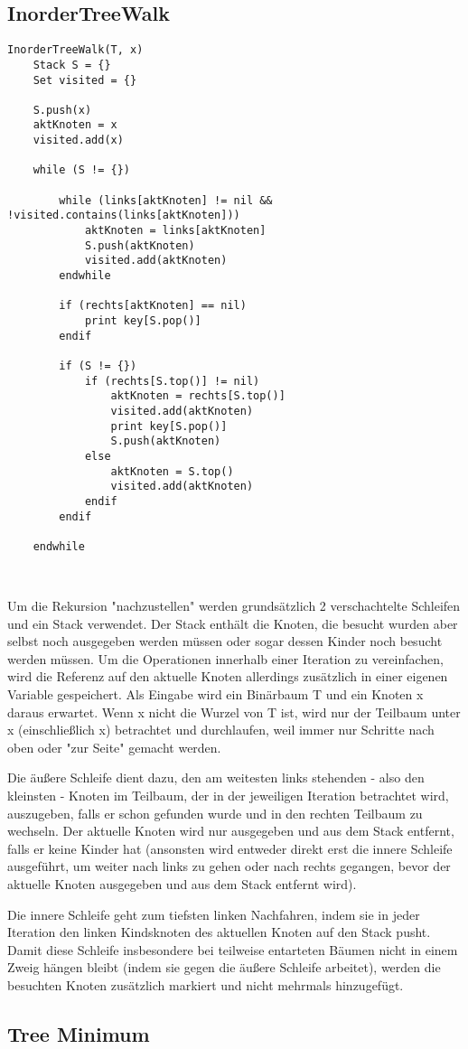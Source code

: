 \subsection*{InorderTreeWalk}

\begin{lstlisting}
InorderTreeWalk(T, x)
	Stack S = {}
	Set visited = {}
	
	S.push(x)
	aktKnoten = x
	visited.add(x)
	
	while (S != {})
	
		while (links[aktKnoten] != nil && !visited.contains(links[aktKnoten]))
			aktKnoten = links[aktKnoten]
			S.push(aktKnoten)
			visited.add(aktKnoten)
		endwhile

		if (rechts[aktKnoten] == nil)
			print key[S.pop()]
		endif
			
		if (S != {})
			if (rechts[S.top()] != nil)
				aktKnoten = rechts[S.top()]
				visited.add(aktKnoten)
				print key[S.pop()]
				S.push(aktKnoten)
			else
				aktKnoten = S.top()
				visited.add(aktKnoten)
			endif
		endif
		
	endwhile
\end{lstlisting}

\begin{tabbing}
\\
\end{tabbing}

Um die Rekursion "nachzustellen" werden grundsätzlich 2 verschachtelte Schleifen und ein Stack verwendet. Der Stack enthält die Knoten, die besucht wurden aber selbst noch ausgegeben werden müssen oder sogar dessen Kinder noch besucht werden müssen. Um die Operationen innerhalb einer Iteration zu vereinfachen, wird die Referenz auf den aktuelle Knoten allerdings zusätzlich in einer eigenen Variable gespeichert. Als Eingabe wird ein Binärbaum T und ein Knoten x daraus erwartet. Wenn x nicht die Wurzel von T ist, wird nur der Teilbaum unter x (einschließlich x) betrachtet und durchlaufen, weil immer nur Schritte nach oben oder "zur Seite" gemacht werden.

Die äußere Schleife dient dazu, den am weitesten links stehenden - also den kleinsten - Knoten im Teilbaum, der in der jeweiligen Iteration betrachtet wird, auszugeben, falls er schon gefunden wurde und in den rechten Teilbaum zu wechseln. 
Der aktuelle Knoten wird nur ausgegeben und aus dem Stack entfernt, falls er keine Kinder hat (ansonsten wird entweder direkt erst die innere Schleife ausgeführt, um weiter nach links zu gehen oder nach rechts gegangen, bevor der aktuelle Knoten ausgegeben und aus dem Stack entfernt wird).

Die innere Schleife geht zum tiefsten linken Nachfahren, indem sie in jeder Iteration den linken Kindsknoten des aktuellen Knoten auf den Stack pusht. 
Damit diese Schleife insbesondere bei teilweise entarteten Bäumen nicht in einem Zweig hängen bleibt (indem sie gegen die äußere Schleife arbeitet), werden die besuchten Knoten zusätzlich markiert und nicht mehrmals hinzugefügt.



\subsection*{Tree Minimum}
